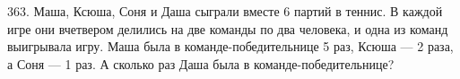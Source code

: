 363. Маша, Ксюша, Соня и Даша сыграли вместе 6 партий в теннис. В каждой игре они вчетвером делились на две команды по два человека, и одна из команд выигрывала игру. Маша была в команде-победительнице 5 раз, Ксюша --- 2 раза, а Соня --- 1 раз. А сколько раз Даша была в команде-победительнице?\\
